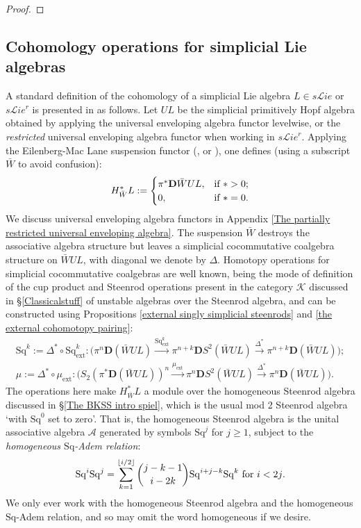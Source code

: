\documentclass[11pt]{amsart} \renewcommand{\baselinestretch}{1.2}
\theoremstyle{plain}
\numberwithin{equation}{section} %
\theoremstyle{plain}
\numberwithin{equation}{chapter} %
\renewcommand{\to}{\longrightarrow}
\newcommand{\scrL}{\mathscr{L}}
\newcommand{\calA}{\mathcal{A}}
\newcommand{\calk}{\mathcal{K}}
\newcommand{\citeBOX}[2][]{\cite[\mbox{#1}]{#2}}
\newcommand{\ExtCohOp}{\mathrm{Sq}_\mathrm{ext}}
\newcommand{\ExtCohProd}{\mu_\mathrm{ext}}
\newcommand{\Sq}{\mathrm{Sq}}
\newcommand{\LieSteen}{\calA}
\newcommand{\liealgs}{{\scrL\!\textit{ie}}}
\newcommand{\restliealgs}{{\scrL\!\textit{ie}^\textit{r}}}
\newcommand{\dual}{\mathbf{D}}
\newcommand{\SubsectionOrSection}[1]{\subsection{#1}}
\begin{document}
\begin{Constructing cohomology operations}
\begin{proof}
\end{proof}
\SubsectionOrSection{Cohomology operations for simplicial Lie algebras}
\label{section: Cohomology operations for simplicial (restricted) Lie algebras}
A standard definition of the cohomology of a simplicial Lie algebra $L\in s\liealgs$ or $s\restliealgs$ is presented in \cite{PriddySimplicialLie.pdf} as follows. Let $UL$ be the simplicial primitively Hopf algebra obtained by applying the universal enveloping algebra functor levelwise, or the \emph{restricted} universal enveloping algebra functor when working in $s\restliealgs$. %
Applying the Eilenberg-Mac Lane suspension functor (\citeBOX[\S2.3]{PriddySimplicialLie.pdf}, \citeBOX[\S5]{MillerSullivanConjecture.pdf} or \citeBOX[p.~87]{MaySimpObj.pdf}), one defines (using a subscript $\bar{W}$ to avoid confusion):
\[H_{\bar{W}}^*L:=\begin{cases}
\pi^*\dual\bar{W}UL,&\textup{if }*>0;\\
0,&\textup{if }*=0.
\end{cases}\]
We discuss universal enveloping algebra functors in Appendix \ref{The partially restricted universal enveloping algebra}.
The suspension $\bar{W}$ destroys the associative algebra structure but leaves a simplicial cocommutative coalgebra structure on $\bar{W}UL$, with diagonal we denote by $\Delta$. Homotopy operations for simplicial cocommutative coalgebras are well known, being the mode of definition of the cup product and Steenrod operations present in the category $\calk$ discussed in \S\ref{Classicalstuff} of unstable algebras over the Steenrod algebra, and can be constructed using  Propositions \ref{external singly simplicial steenrods} and \ref{the external cohomotopy pairing}:
\begin{gather*}
\Sq^k:=\Delta^*\circ\ExtCohOp^k:\bigl(\pi^n\dual (\bar{W}UL)\overset{\ExtCohOp^k}{\to}\pi^{n+k}\dual S^2(\bar{W}UL)\overset{\Delta^*}{\to}\pi^{n+k}\dual (\bar{W}UL)\bigr);\\
\mu:=\Delta^*\circ\ExtCohProd:\bigl(S_2(\pi^*\dual(\bar{W}UL))^{n}\overset{\ExtCohProd}{\to}
\pi^n\dual S^2(\bar{W}UL)\overset{\Delta^*}{\to}\pi^n\dual (\bar{W}UL)\bigr).
\end{gather*}
The operations here make $H^*_{\bar{W}}L$ a module over the homogeneous Steenrod algebra discussed in \S\ref{The BKSS intro spiel}, which is the usual mod 2 Steenrod algebra `with $\Sq^0$ set to zero'. That is, the homogeneous Steenrod algebra is the unital associative algebra $\LieSteen$ generated by symbols $\Sq^j$ for $j\geq1$, subject to the \emph{homogeneous $\Sq$-Adem relation}:
\[\Sq^i\Sq^j=\sum_{k=1}^{\lfloor i/2\rfloor}\binom{j-k-1}{ i-2k}\Sq^{i+j-k}\Sq^k\textup{\ for $i<2j$.}\]
We only ever work with the homogeneous Steenrod algebra and the homogeneous $\Sq$-Adem relation, and so may omit the word homogeneous if we desire.


\end{Constructing cohomology operations}
\end{document}
